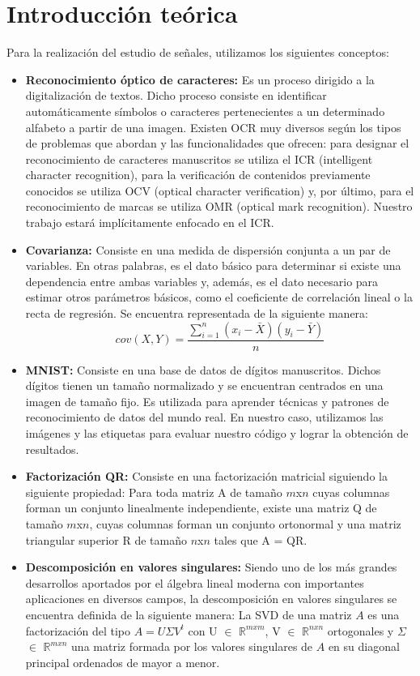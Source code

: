 \documentclass[10pt, a4paper]{article}
\begin{document}
\section{Introducci\'on te\'orica}
Para la realización del estudio de señales, utilizamos los siguientes conceptos:
\begin{itemize}
\item {\textbf{Reconocimiento óptico de caracteres:}} Es un proceso dirigido a la digitalización de textos. Dicho proceso consiste en identificar automáticamente símbolos o caracteres pertenecientes a un determinado alfabeto a partir de una imagen. Existen OCR muy diversos según los tipos de problemas que abordan y las funcionalidades que ofrecen: para designar el reconocimiento de caracteres manuscritos se utiliza el ICR (intelligent character recognition), para la verificación de contenidos previamente conocidos se utiliza OCV (optical character verification) y, por último, para el reconocimiento de marcas se utiliza OMR (optical mark recognition). Nuestro trabajo estará implícitamente enfocado en el ICR. 
\item {\textbf{Covarianza:}} Consiste en una medida de dispersión conjunta a un par de variables. En otras palabras, es el dato básico para determinar si existe una dependencia entre ambas variables y, además, es el dato necesario para estimar otros parámetros básicos, como el coeficiente de correlación lineal o la recta de regresión. Se encuentra representada de la siguiente manera: $$cov(X, Y) = \frac{\sum_{i=1}^{n} (x_i - \bar{X})(y_i - \bar{Y})}{n}$$
\item {\textbf{MNIST:}} Consiste en una base de datos de dígitos manuscritos. Dichos dígitos tienen un tamaño normalizado y se encuentran centrados en una imagen de tamaño fijo. Es utilizada para aprender técnicas y patrones de reconocimiento de datos del mundo real. En nuestro caso, utilizamos las imágenes y las etiquetas para evaluar nuestro código y lograr la obtención de resultados.
\item {\textbf{Factorización QR:}} Consiste en una factorización matricial siguiendo la siguiente propiedad: Para toda matriz A de tamaño $m$x$n$ cuyas columnas forman un conjunto linealmente independiente, existe una matriz Q de tamaño $m$x$n$, cuyas columnas forman un conjunto ortonormal y una matriz triangular superior R de tamaño $n$x$n$ tales que A = QR.
\item {\textbf{Descomposición en valores singulares:}} Siendo uno de los más grandes desarrollos aportados por el álgebra lineal moderna con importantes aplicaciones en diversos campos, la descomposición en valores singulares se encuentra definida de la siguiente manera:\newline
La SVD de una matriz $A$ es una factorización del tipo $A = U \Sigma V^t$ con U $\in$ $\mathbb{R}^{mxm}$,  V $\in$ $\mathbb{R}^{nxn}$ ortogonales y $\Sigma$ $\in$ $\mathbb{R}^{mxn}$ una matriz formada por los valores singulares de $A$ en su diagonal principal ordenados de mayor a menor.
 
\end{itemize}
\end{document}
